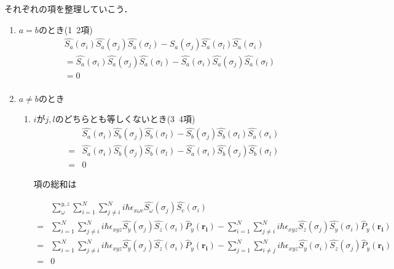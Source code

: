 \documentclass{article}
\begin{document}
それぞれの項を整理していこう．
\begin{enumerate}
    \item $a=b$のとき(1~2項)
    \begin{equation}
        \begin{split}
        \label{}
        &{\hat{S_a}}(\sigma_i) \hat{S_{a}}{(\sigma_j)} \hat{S_{a}}{(\sigma_l)} -  \hat{S_{a}}{(\sigma_j)} \hat{S_{a}}{(\sigma_l)} {\hat{S_a}}(\sigma_i)\\
        &={\hat{S_a}}(\sigma_i) \hat{S_{a}}{(\sigma_j)} \hat{S_{a}}{(\sigma_l)} -  \hat{S_{a}}{(\sigma_i)} \hat{S_{a}}{(\sigma_j)} {\hat{S_a}}(\sigma_l)\\
        &=0\\    
        \end{split}
    \end{equation}
    
    \item $a\neq b$のとき
    \begin{enumerate}
        \item  $i$が$j,l$のどちらとも等しくないとき(3~4項)
        \begin{equation}
            \begin{split}
            \label{}
            &{\hat{S_a}}(\sigma_i) \hat{S_{b}}{(\sigma_j)} \hat{S_{b}}{(\sigma_l)} -  \hat{S_{b}}{(\sigma_j)} \hat{S_{b}}{(\sigma_l)} {\hat{S_a}}(\sigma_i)\\
            =&{\hat{S_a}}(\sigma_i) \hat{S_{b}}{(\sigma_j)} \hat{S_{b}}{(\sigma_l)} - {\hat{S_a}}(\sigma_i)  \hat{S_{b}}{(\sigma_j)} \hat{S_{b}}{(\sigma_l)}    \\
            =&0    
        \end{split}
        \end{equation}

        項の総和は

\begin{equation}
\begin{split}
\label{}
&\sum_{\omega}^{y,z}\sum_{i=1}^{N} \sum_{j\neq i}^{N} i\hbar \epsilon_{x \omega c}\hat{S_{\omega}}{(\sigma_j)} \hat{S_c}(\sigma_i)\\  
=&\sum_{i=1}^{N} \sum_{j\neq i}^{N} i\hbar \epsilon_{x yz}\hat{S_{y}}{(\sigma_j)} \hat{S_z}(\sigma_i){\hat{P}_y}{(\boldsymbol{r_i})} - \sum_{i=1}^{N} \sum_{j\neq i}^{N} i\hbar \epsilon_{xyz}\hat{S_{z}}{(\sigma_j)} \hat{S_y}(\sigma_i){\hat{P}_y}{(\boldsymbol{r_i})}\\ 
=&\sum_{i=1}^{N} \sum_{j\neq i}^{N} i\hbar \epsilon_{x yz}\hat{S_{y}}{(\sigma_j)} \hat{S_z}(\sigma_i){\hat{P}_y}{(\boldsymbol{r_i})} - \sum_{j=1}^{N} \sum_{i\neq j}^{N} i\hbar \epsilon_{xyz}\hat{S_{y}}{(\sigma_i)} \hat{S_z}(\sigma_j){\hat{P}_y}{(\boldsymbol{r_i})}\\ 
=&0
\end{split}
\end{equation}



\end{enumerate}
\end{enumerate}
\end{document}
